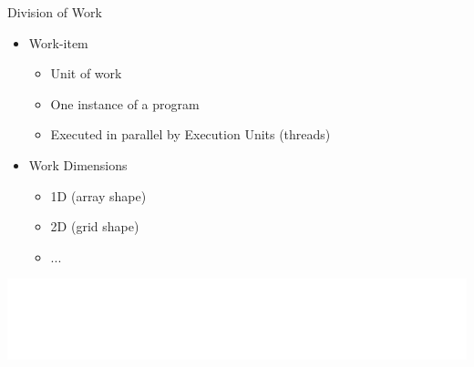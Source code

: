 

\begin{frame}{Division of Work}

\begin{itemize}
    \item Work-item
    \begin{itemize}
        \item Unit of work
        \item One instance of a program
        \item Executed in parallel by Execution Units (threads)
    \end{itemize}
    \item Work Dimensions
    \begin{itemize}
        \item 1D (array shape)
        \item 2D (grid shape)
        \item ...
    \end{itemize}
\end{itemize}

\vspace{4ex}
\hspace{1em}\includegraphics[scale=0.50]{images/work-items.pdf}

\end{frame}


